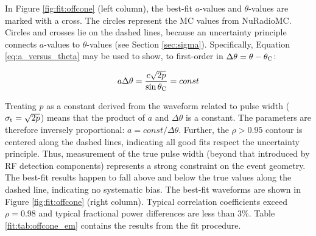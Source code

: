 \documentclass[amsmath,amssymb,aps,prd,10pt,twocolumn]{revtex4}
\begin{document}
In Figure \ref{fig:fit:offcone} (left column), the best-fit $a$-values and $\theta$-values are marked with a cross.  The circles represent the MC values from NuRadioMC.  Circles and crosses lie on the dashed lines, because an uncertainty principle connects $a$-values to $\theta$-values (see Section \ref{sec:sigma}).  Specifically, Equation \ref{eq:a_versus_theta} may be used to show, to first-order in $\Delta \theta = \theta - \theta_{\rm C}$:

\begin{equation}
a \Delta\theta = \frac{c\sqrt{2p}}{\sin\theta_{\rm C}} = const
\end{equation}

Treating $p$ as a constant derived from the waveform related to pulse width ($\sigma_{\rm t} = \sqrt{2 p}$) means that the product of $a$ and $\Delta \theta$ is a constant.  The parameters are therefore inversely proportional: $a = const/\Delta\theta$.  Further, the $\rho>0.95$ contour is centered along the dashed lines, indicating all good fits respect the uncertainty principle.  Thus, measurement of the true pulse width (beyond that introduced by RF detection components) represents a strong constraint on the event geometry.  The best-fit results happen to fall above and below the true values along the dashed line, indicating no systematic bias.  The best-fit waveforms are shown in Figure \ref{fig:fit:offcone} (right column).  Typical correlation coefficients exceed $\rho = 0.98$ and typical fractional power differences are less than 3\%.  Table \ref{fit:tab:offcone_em} contains the results from the fit procedure.
\end{document}
